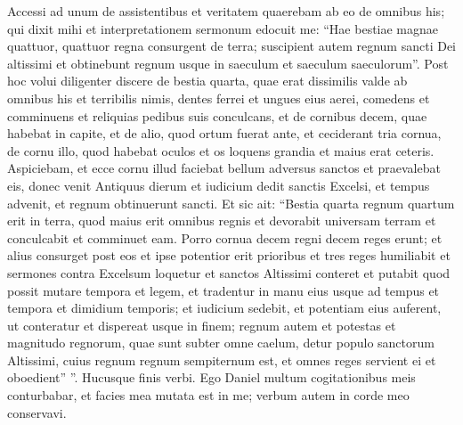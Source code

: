 \begin{biblechapter}
\begin{biblechapter}
\begin{biblechapter}
\begin{biblechapter}
\begin{biblechapter}
\begin{biblechapter}
\begin{biblechapter}
\verse Accessi ad unum de assistentibus et veritatem quaerebam ab eo de omnibus his; qui dixit mihi et interpretationem sermonum edocuit me: 
\verse “Hae bestiae magnae quattuor, quattuor regna consurgent de terra; 
\verse suscipient autem regnum sancti Dei altissimi et obtinebunt regnum usque in saeculum et saeculum saeculorum”.
 \verse Post hoc volui diligenter discere de bestia quarta, quae erat dissimilis valde ab omnibus his et terribilis nimis, dentes ferrei et ungues eius aerei, comedens et comminuens et reliquias pedibus suis conculcans, 
\verse et de cornibus decem, quae habebat in capite, et de alio, quod ortum fuerat ante, et ceciderant tria cornua, de cornu illo, quod habebat oculos et os loquens grandia et maius erat ceteris. 
\verse Aspiciebam, et ecce cornu illud faciebat bellum adversus sanctos et praevalebat eis, 
\verse donec venit Antiquus dierum et iudicium dedit sanctis Excelsi, et tempus advenit, et regnum obtinuerunt sancti. 
 \verse Et sic ait: “Bestia quarta regnum quartum erit in terra, quod maius erit omnibus regnis et devorabit universam terram et conculcabit et comminuet eam. 
 \verse Porro cornua decem regni decem reges erunt; et alius consurget post eos et ipse potentior erit prioribus et tres reges humiliabit 
\verse et sermones contra Excelsum loquetur et sanctos Altissimi conteret et putabit quod possit mutare tempora et legem, et tradentur in manu eius usque ad tempus et tempora et dimidium temporis; 
\verse et iudicium sedebit, et potentiam eius auferent, ut conteratur et dispereat usque in finem; 
\verse regnum autem et potestas et magnitudo regnorum, quae sunt subter omne caelum, detur populo sanctorum Altissimi, cuius regnum regnum sempiternum est, et omnes reges servient ei et oboedient” ”. 
\verse Hucusque finis verbi. Ego Daniel multum cogitationibus meis conturbabar, et facies mea mutata est in me; verbum autem in corde meo conservavi.
 

\end{biblechapter}
\end{biblechapter}
\end{biblechapter}
\end{biblechapter}
\end{biblechapter}
\end{biblechapter}
\end{biblechapter}
